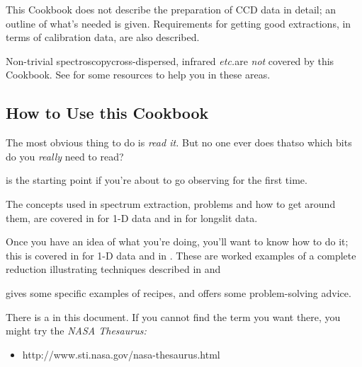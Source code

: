 This Cookbook does not describe the preparation of CCD data in detail;
an outline of what's needed is given.  Requirements for getting good
extractions, in terms of calibration data, are also described.

Non-trivial spectroscopy\scspec{---}{ - }cross-dispersed,
infrared {\it{etc.}}\scspec{---}{ - }are {\em not} covered by this
Cookbook.
See 
{}
for some resources to help you in these areas.


\subsection{How to Use this Cookbook}

The most obvious thing to do is {\em read it.}  But no one ever
does that\scspec{---}{ - }so which bits do you {\em really} need to read?

\scspec{\S\ref{preparing_for_observing}}
{} is the starting
point if you're about to go observing for the first time.

The concepts used in spectrum extraction, problems and how to get around
them, are covered in \scspec{\S\ref{basic_reduction_steps}}
{} for 1-D data and in \scspec{\S\ref{longslit_reduction_steps}}
{} for longslit data. 

Once you have an idea of what you're doing, you'll want to know how to do it;
this is covered in \scspec{\S\ref{simple_worked_example}}
{} for 1-D data and in \scspec{\S\ref{longslit_worked_example}}
{}.
These are worked examples of a complete reduction illustrating techniques
described in  and \scspec{\S\ref{longslit_reduction_steps}}
{}

 gives
some specific examples of recipes, and offers some problem-solving advice.

There is a  in this document.
If you cannot find the term you want there, you might try the
{\sl NASA Thesaurus:}

\begin{itemize}

\item {}
      {
      {http://www.sti.nasa.gov/nasa-thesaurus.html}}

\end{itemize}


